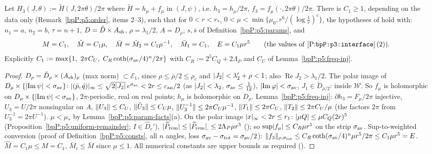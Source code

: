 \begin{lemma}\label{bpP:p5:kam-hyp}
Let $H_3(J,\theta):=\tilde H(J,2\pi\theta)/2\pi$ where $\tilde H=h_\mu+f_\mu$ in $(J,\psi)$, i.e. $h_3=h_\mu/2\pi$, $f_3=f_\mu(\cdot,2\pi\theta)/2\pi$. There is $C_1\ge1$, depending on the data only (Remark~\ref{bpP:p5:order}, items 2--3), such that for $0<r<r_*$, $0<\mu<\min\{\mu_0,r^6/(\log\frac1r)^c\}$, the hypotheses of  hold with: $n_1=a$, $n_2=b$, $\tau=n+1$, $D=\check D\times A_{\rm sh}$, $\rho=\lambda_1/2$, $A=D_\rho$, $s,\bar s$ of Definition~\ref{bpP:p5:params}, and
\[M=C_1,\quad\hat M=C_1\mu,\quad\bar M=\bar M_2=C_1\mu^{-1},\quad\bar M_1=C_1,\quad E=C_1\mu r^5\qquad(\text{the values of \textup{[P:\texttt{bpP:p3:interface}]}\,(2)}).\]
Explicitly $C_1:=\max\{1,\ 2\pi C_U,\ C_R\coth(\sigma_{\rm av}/4)^n/2\pi\}$ with $C_R:=2^5C_Q+2\Lambda_P$ and $C_U$ of Lemma~\ref{bpP:p5:freq-inj}.
\end{lemma}
\begin{proof}
\label{stepP:p5:kh-dom} $D_\rho=\check D_\rho\times(A_{\rm sh})_\rho$ (max norm) $\subset\mathcal E_1$, since $\rho\le\bar\rho/2\le\rho_c$ and $\lvert J_2\rvert<\lambda_2'+\rho<1$; also $\operatorname{Re}J_2>\lambda_1/2$. The polar image of $D_\rho\times\{\lvert \operatorname{Im}\psi\rvert<\sigma_{\rm av}\}$: $\lvert (\bar p,\bar q)\rvert_\infty\le\sqrt{2\lvert J_2\rvert}\,e^{\sigma_{\rm av}}<2r\le\varepsilon_{\rm an}/2$ (as $\lvert J_2\rvert<\lambda_2$, $\sigma_{\rm av}\le\frac1{12}$), $\lvert \operatorname{Im}\varphi\rvert<\sigma_{\rm av}$, $J_1\in\check D_{\bar\rho/2}$: inside $\mathcal W$. So $f_\mu$ is holomorphic on $D_\rho\times\{\lvert \operatorname{Im}\psi\rvert<\sigma_{\rm av}\}$, $2\pi$-periodic, real on real points; $h_\mu$ is holomorphic on $D_\rho$.
\label{stepP:p5:kh-h} Lemma~\ref{bpP:p5:freq-inj}: $\partial h_3=F_\mu/2\pi$ injective, $U_3=U/2\pi$ nonsingular on $A$, $\lVert U_3\rVert\le C_U$, $\lVert \hat U_3\rVert\le C_U\mu$, $\lVert U_3^{-1}\rVert\le2\pi C_U\mu^{-1}$, $\lVert T_1\rVert\le2\pi C_U$, $\lVert T_2\rVert\le2\pi C_U/\mu$ (the factors $2\pi$ from $U_3^{-1}=2\pi U^{-1}$). $\mu<\mu_*$ by Lemma~\ref{bpP:p5:param-facts}(a).
\label{stepP:p5:kh-f} On the polar image $\lvert x\rvert_\infty<2r\le r_1$: $\lvert \mu Q\rvert\le\mu C_Q(2r)^5$ (Proposition~\ref{bpP:p5:uniform-remainder}; $I\in\hat D_c'$), $\lvert \widetilde P_{\rm rem}\rvert\le\lvert \widetilde P_{\rm rem}\rvert_{,}\le2\Lambda_P\mu r^5$ (); so $\sup\lvert f_\mu\rvert\le C_R\mu r^5$ on the strip $\sigma_{\rm av}$. Sup-to-weighted conversion (proof of Definition~\ref{bpP:p5:consts}, all $n$ angles, loss $\sigma_{\rm av}-\sigma_{\rm tot}=\sigma_{\rm av}/2$): $\lVert f_3\rVert_{\rho,\sigma_{\rm tot}}\le C_R\coth(\sigma_{\rm av}/4)^n\mu r^5/2\pi\le C_1\mu r^5=E$.
\label{stepP:p5:kh-norm} $\hat M=C_1\mu\le M=C_1$, $\bar M_i\le\bar M$ since $\mu\le1$. All numerical constants are upper bounds as required ().
\end{proof}

